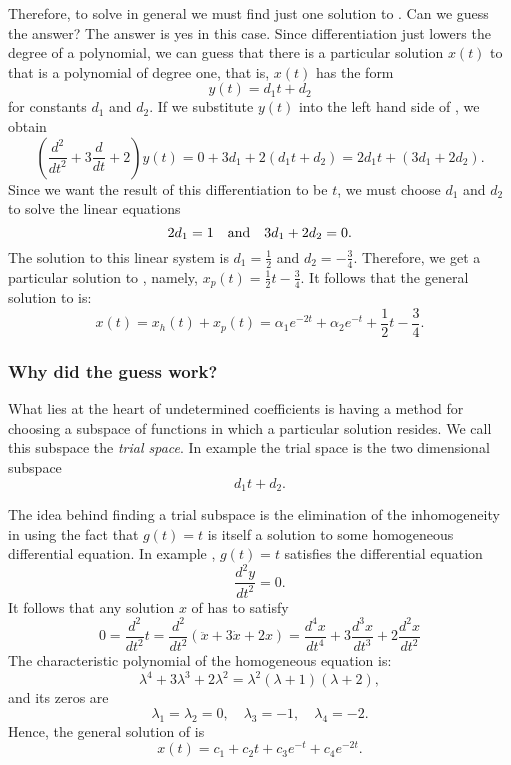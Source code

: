 \documentclass{ximera}
\begin{document}
Therefore, to solve  in general we must find just one 
solution to .  Can we guess the answer?  The answer is
yes in this case.  Since differentiation just lowers the degree of a 
polynomial, we can guess that there is a particular solution $x(t)$ to 
 that is a polynomial of degree one, that is, $x(t)$ 
has the form 
\[
y(t)=d_1t+d_2
\]
for constants $d_1$ and $d_2$.  If we substitute $y(t)$ 
into the left hand side of , we obtain
\[
\left(\frac{d^2}{dt^2}+3\frac{d}{dt}+2\right)y(t) = 
0+3d_1+2(d_1t+d_2) = 2d_1t + (3d_1+2d_2).
\]
Since we want the result of this differentiation to be $t$, we must choose 
$d_1$ and $d_2$ to solve the linear equations
\[
2d_1 = 1 \quad\mbox{and}\quad 3d_1+2d_2=0.
\]
The solution to this linear system is $d_1=\frac{1}{2}$ and 
$d_2=-\frac{3}{4}$.   Therefore, we get a 
particular solution to 
, namely, $x_p(t)=\frac{1}{2}t-\frac{3}{4}$.  
It follows that the general solution to  is:
\[
x(t) = x_h(t)+x_p(t) = \alpha_1e^{-2t} + \alpha_2e^{-t} + 
\frac{1}{2}t-\frac{3}{4}.
\]

\subsubsection*{Why did the guess work?}

What lies at the heart of undetermined coefficients is having a method 
for choosing a subspace of functions in which a particular solution resides.  
We call this subspace the {\em trial space}.  In example 
 the trial space is the two dimensional subspace
\[
d_1t + d_2.
\]

The idea behind finding a trial subspace is the elimination of the 
inhomogeneity in  using the fact that $g(t)=t$ is 
itself a solution to some homogeneous differential equation.  In example 
, $g(t)=t$ satisfies the differential equation
\[
\frac{d^2y}{dt^2} = 0.
\]
It follows that any solution $x$ of  has to satisfy
\begin{equation}  \label{e:undetc2}
0 = \frac{d^2}{dt^2}t=\frac{d^2}{dt^2}(\ddot{x} + 3\dot{x}+2x) = 
\frac{d^4x}{dt^4} + 3\frac{d^3x}{dt^3} + 2\frac{d^2x}{dt^2}
\end{equation}
The characteristic 
polynomial
of the homogeneous equation 
 is: 
\[
\lambda^4 + 3\lambda^3 + 2\lambda^2 = \lambda^2(\lambda+1)(\lambda+2),
\]
and its zeros are
\[
\lambda_1=\lambda_2=0,\quad \lambda_3=-1,\quad \lambda_4 = -2.
\]
Hence, the general solution of  is
\[
x(t) = c_1 + c_2 t + c_3 e^{-t} + c_4 e^{-2t}.
\]
\end{document}

